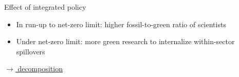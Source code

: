 \documentclass[11pt,aspectratio=169]{beamer}
\begin{document}
\begin{frame}{Effect  of integrated policy}
\begin{figure}[h!!]
\begin{subfigure}{0.45\textwidth}
		\end{subfigure}
	\end{figure}
		\vspace{3mm}	
	\begin{block}{}
		\begin{itemize}
			\item In run-up to net-zero limit: higher fossil-to-green ratio of scientists %
			\item Under net-zero limit: more green research to internalize within-sector spillovers %
		\end{itemize}
	\end{block}	
	
	\vspace{-5.5mm}
	\hfill
	\hyperlink{mec0}{\tiny{$\rightarrow$ decomposition}}
\end{frame}
		
	\hypertarget{conc}{}
\end{document}
